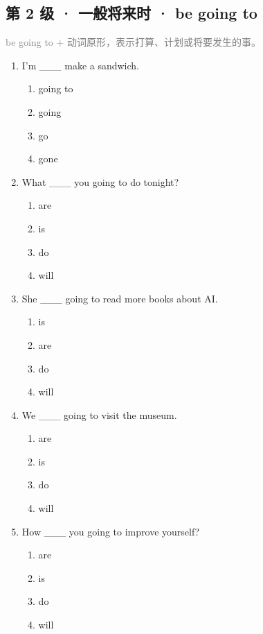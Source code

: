 \documentclass[11pt,a4paper]{ctexart}
\begin{document}
\subsection*{第 2 级 · 一般将来时 · be going to}
\noindent\textcolor{gray}{be going to + 动词原形，表示打算、计划或将要发生的事。}\par\smallskip
\begin{enumerate}[leftmargin=*,itemsep=4pt]
\item I’m \_\_\_ make a sandwich.
\begin{enumerate}[label=\Alph*.,leftmargin=2em,itemsep=1pt,topsep=2pt]
\item going to
\item going
\item go
\item gone
\end{enumerate}
\item What \_\_\_ you going to do tonight?
\begin{enumerate}[label=\Alph*.,leftmargin=2em,itemsep=1pt,topsep=2pt]
\item are
\item is
\item do
\item will
\end{enumerate}
\item She \_\_\_ going to read more books about AI.
\begin{enumerate}[label=\Alph*.,leftmargin=2em,itemsep=1pt,topsep=2pt]
\item is
\item are
\item do
\item will
\end{enumerate}
\item We \_\_\_ going to visit the museum.
\begin{enumerate}[label=\Alph*.,leftmargin=2em,itemsep=1pt,topsep=2pt]
\item are
\item is
\item do
\item will
\end{enumerate}
\item How \_\_\_ you going to improve yourself?
\begin{enumerate}[label=\Alph*.,leftmargin=2em,itemsep=1pt,topsep=2pt]
\item are
\item is
\item do
\item will

\end{enumerate}
\end{enumerate}
\end{document}
